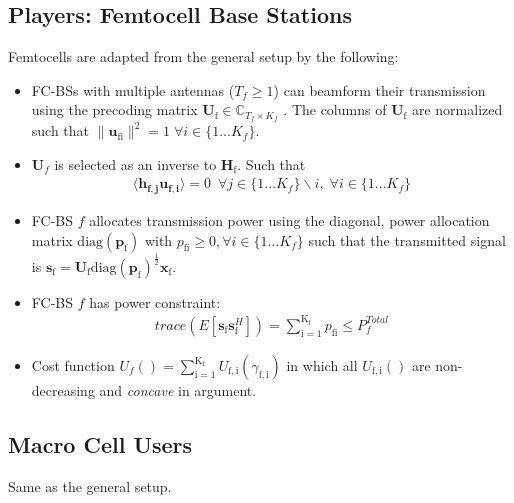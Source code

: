 \documentclass[12pt,a4paper]{report}
\begin{document}
\subsection{Players: Femtocell Base Stations}
Femtocells are adapted from the general setup by the following:
\begin{itemize}
\item 
	FC-BSs with multiple antennas ($T_f \geq 1$) can beamform their transmission using the precoding 	
	matrix $\mathbf{U}_{\mathrm{f}} \in \mathbb{C}_{T_f \times K_f}$ .
	The columns of $\mathbf{U}_{\mathrm{f}}$ are normalized such that 
	 $\|\mathbf{u}_{\mathrm{fi}}\|^2 =1 \;\forall i \in \{1 ... K_f\}$.
\\

\item 
$\mathbf{U}_f$ is selected as an inverse to $\mathbf{H_\mathrm{f}}$.
Such that
\begin{gather*}
\langle \mathbf{h_{f,j}}\mathbf{u_{f,i}} \rangle =0\  \; \forall j \in \{1... K_f\}\backslash i ,\; \forall i \in \{1 ... K_f\}
\end{gather*}

\item  
	FC-BS $f$ allocates  transmission power using the diagonal, power allocation  	
	matrix $\mathrm{diag}(\mathbf{p}_{\mathrm{f}})$ with $p_{\mathrm{fi}} \geq 0, \forall i \in \{1 ... K_f\}$
such that the transmitted 		
	signal is 
	$\mathbf{s}_{\mathrm{f}	}= \mathbf{U_{\mathrm{f}}} 
	\mathrm{diag}(\mathbf{p}_{\mathrm{f}})^{\frac{1}{2}}
	\mathbf{x_{\mathrm{f}}}$.
\\
\item 
	FC-BS $f$ has power constraint:
	\begin{gather*}
	trace(E[\mathbf{s}_\mathrm{f}\mathbf{s}_\mathrm{f}^H]) =
	\sum_{\mathrm{i=1}}^{\mathrm{K_{\mathrm{f}}}} p_{\mathrm{fi}}
	  \leq P^{Total}_{f} 
	  	\end{gather*}



\item 
	Cost function $U_f() =
	\sum_{\mathrm{i=1}}^{\mathrm{K_f}}
    	U_{\mathrm{f,i}}(\gamma_{\mathrm{f,i}}) $
    	in which all $U_{\mathrm{f,i}}()$ are non-decreasing and \emph{concave} in argument.

\end{itemize}

\subsection{Macro Cell Users}
Same as the general setup.
\end{document}
